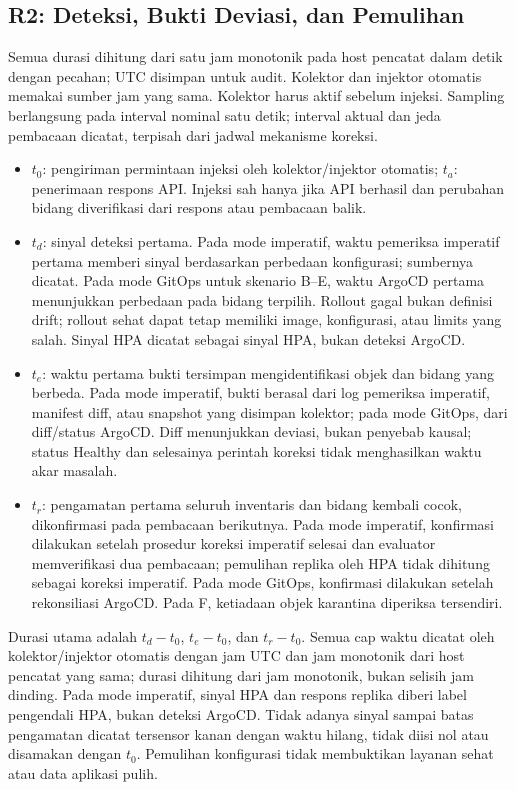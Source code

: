 \subsection{R2: Deteksi, Bukti Deviasi, dan Pemulihan}

Semua durasi dihitung dari satu jam monotonik pada host pencatat dalam detik dengan pecahan; UTC disimpan untuk audit. Kolektor dan injektor otomatis memakai sumber jam yang sama. Kolektor harus aktif sebelum injeksi. Sampling berlangsung pada interval nominal satu detik; interval aktual dan jeda pembacaan dicatat, terpisah dari jadwal mekanisme koreksi.

\begin{itemize}
  \item $t_0$: pengiriman permintaan injeksi oleh kolektor/injektor otomatis; $t_a$: penerimaan respons API. Injeksi sah hanya jika API berhasil dan perubahan bidang diverifikasi dari respons atau pembacaan balik.
  \item $t_d$: sinyal deteksi pertama. Pada mode imperatif, waktu pemeriksa imperatif pertama memberi sinyal berdasarkan perbedaan konfigurasi; sumbernya dicatat. Pada mode GitOps untuk skenario B--E, waktu ArgoCD pertama menunjukkan perbedaan pada bidang terpilih. Rollout gagal bukan definisi drift; rollout sehat dapat tetap memiliki image, konfigurasi, atau limits yang salah. Sinyal HPA dicatat sebagai sinyal HPA, bukan deteksi ArgoCD.
  \item $t_e$: waktu pertama bukti tersimpan mengidentifikasi objek dan bidang yang berbeda. Pada mode imperatif, bukti berasal dari log pemeriksa imperatif, manifest diff, atau snapshot yang disimpan kolektor; pada mode GitOps, dari diff/status ArgoCD. Diff menunjukkan deviasi, bukan penyebab kausal; status Healthy dan selesainya perintah koreksi tidak menghasilkan waktu akar masalah.
  \item $t_r$: pengamatan pertama seluruh inventaris dan bidang kembali cocok, dikonfirmasi pada pembacaan berikutnya. Pada mode imperatif, konfirmasi dilakukan setelah prosedur koreksi imperatif selesai dan evaluator memverifikasi dua pembacaan; pemulihan replika oleh HPA tidak dihitung sebagai koreksi imperatif. Pada mode GitOps, konfirmasi dilakukan setelah rekonsiliasi ArgoCD. Pada F, ketiadaan objek karantina diperiksa tersendiri.
\end{itemize}

Durasi utama adalah $t_d-t_0$, $t_e-t_0$, dan $t_r-t_0$. Semua cap waktu dicatat oleh kolektor/injektor otomatis dengan jam UTC dan jam monotonik dari host pencatat yang sama; durasi dihitung dari jam monotonik, bukan selisih jam dinding. Pada mode imperatif, sinyal HPA dan respons replika diberi label pengendali HPA, bukan deteksi ArgoCD. Tidak adanya sinyal sampai batas pengamatan dicatat tersensor kanan dengan waktu hilang, tidak diisi nol atau disamakan dengan $t_0$. Pemulihan konfigurasi tidak membuktikan layanan sehat atau data aplikasi pulih.

